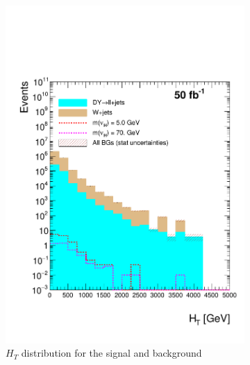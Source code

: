  
\begin{figure}[h]
\centering
\begin{subfigure}{.5\textwidth}
  \centering
  \includegraphics[width=1.1\linewidth]{./Capitulos/Analysis/AfterBJets/HT_MET_20}
  \caption{$H_T$ distribution for the signal and background}
  \label{HT_bjets}
\end{subfigure}%
\begin{subfigure}{.5\textwidth}
  \centering

\end{subfigure}
\end{figure}

